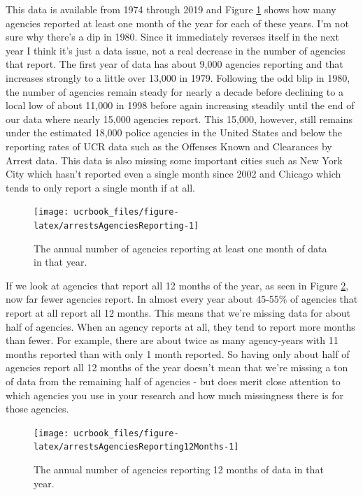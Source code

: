 \documentclass[
  12pt,
  openany]{book}
\begin{document}
This data is available from 1974 through 2019 and Figure \ref{fig:arrestsAgenciesReporting} shows how many agencies reported at least one month of the year for each of these years. I'm not sure why there's a dip in 1980. Since it immediately reverses itself in the next year I think it's just a data issue, not a real decrease in the number of agencies that report. The first year of data has about 9,000 agencies reporting and that increases strongly to a little over 13,000 in 1979. Following the odd blip in 1980, the number of agencies remain steady for nearly a decade before declining to a local low of about 11,000 in 1998 before again increasing steadily until the end of our data where nearly 15,000 agencies report. This 15,000, however, still remains under the estimated 18,000 police agencies in the United States and below the reporting rates of UCR data such as the Offenses Known and Clearances by Arrest data. This data is also missing some important cities such as New York City which hasn't reported even a single month since 2002 and Chicago which tends to only report a single month if at all.

\begin{figure}

{\centering \texttt{[image: ucrbook\_files/figure-latex/arrestsAgenciesReporting-1]} 

}

\caption{The annual number of agencies reporting at least one month of data in that year.}\label{fig:arrestsAgenciesReporting}
\end{figure}

If we look at agencies that report all 12 months of the year, as seen in Figure \ref{fig:arrestsAgenciesReporting12Months}, now far fewer agencies report. In almost every year about 45-55\% of agencies that report at all report all 12 months. This means that we're missing data for about half of agencies. When an agency reports at all, they tend to report more months than fewer. For example, there are about twice as many agency-years with 11 months reported than with only 1 month reported. So having only about half of agencies report all 12 months of the year doesn't mean that we're missing a ton of data from the remaining half of agencies - but does merit close attention to which agencies you use in your research and how much missingness there is for those agencies.

\begin{figure}

{\centering \texttt{[image: ucrbook\_files/figure-latex/arrestsAgenciesReporting12Months-1]} 

}

\caption{The annual number of agencies reporting 12 months of data in that year.}\label{fig:arrestsAgenciesReporting12Months}
\end{figure}
\end{document}
